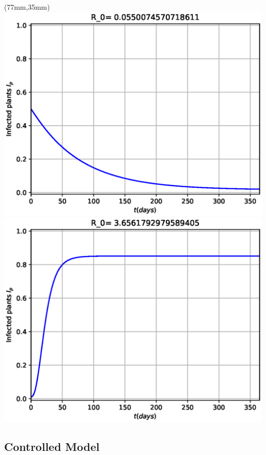 \begin{frame}
\begin{textblock*}{55mm}
		\end{textblock*}
		\begin{textblock*}{50mm}(77mm,35mm)
			\only<2>
			{
				\includegraphics[width=\linewidth]{Feathergraphics/Tomato_simulation_1.eps}
			}
			\only<3>
			{
				\includegraphics[width=\linewidth]{Feathergraphics/Tomato_simulation_2.eps}
			}
		\end{textblock*}	
	\end{frame}
\subsection{Controlled Model}

